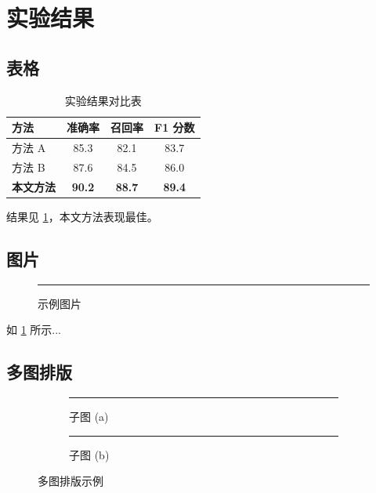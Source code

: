 \documentclass[12pt, a4paper]{article}
\begin{document}
\section{实验结果}

\subsection{表格}
\label{sec:table}

\begin{table}[H]
    \centering
    \caption{实验结果对比表}
    \label{tab:results}
    \begin{tabular}{lccc}
        \toprule
        方法 & 准确率 & 召回率 & F1 分数 \\
        \midrule
        方法 A & 85.3 & 82.1 & 83.7 \\
        方法 B & 87.6 & 84.5 & 86.0 \\
        \textbf{本文方法} & \textbf{90.2} & \textbf{88.7} & \textbf{89.4} \\
        \bottomrule
    \end{tabular}
\end{table}

结果见 \cref{tab:results}，本文方法表现最佳。

\subsection{图片}
\label{sec:figure}

\begin{figure}[H]
    \centering
    \rule{0.8\textwidth}{0.4\textwidth} %
    \caption{示例图片}
    \label{fig:example}
\end{figure}

如 \cref{fig:example} 所示...

\subsection{多图排版}

\begin{figure}[H]
    \centering
    \begin{subfigure}{0.45\textwidth}
        \centering
        \rule{0.9\textwidth}{0.3\textwidth}
        \caption{子图 (a)}
    \end{subfigure}
    \hfill
    \begin{subfigure}{0.45\textwidth}
        \centering
        \rule{0.9\textwidth}{0.3\textwidth}
        \caption{子图 (b)}
    \end{subfigure}
    \caption{多图排版示例}
\end{figure}
\end{document}

